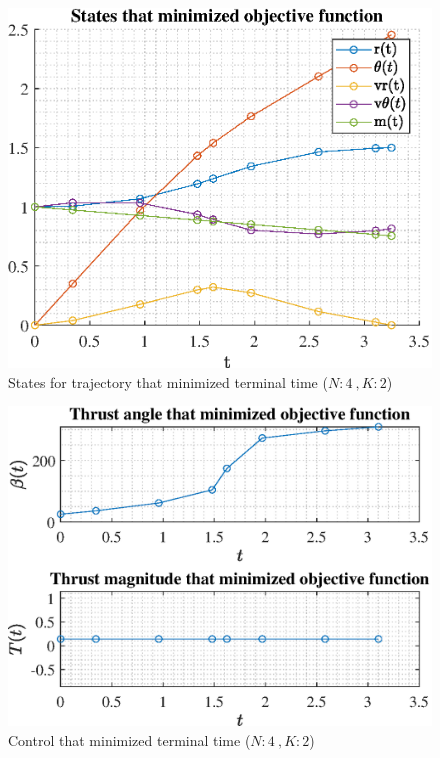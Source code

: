 \documentclass[]{article}
\begin{document}
\begin{figure}
	\centering
	\includegraphics[scale=0.75]{states_N4_K2_C3_tf.eps}
	\caption{States for trajectory that minimized terminal time (\(N:4\ , K:2\))}
	\label{fig:states_N4_K2_C3_tf}
\end{figure}
\begin{figure}
	\centering
	\includegraphics[scale=0.75]{control_N4_K2_C3_tf.eps}
	\caption{Control that minimized terminal time (\(N:4\ , K:2\))}
	\label{fig:control_N4_K2_C3_tf}
\end{figure}
\end{document}
